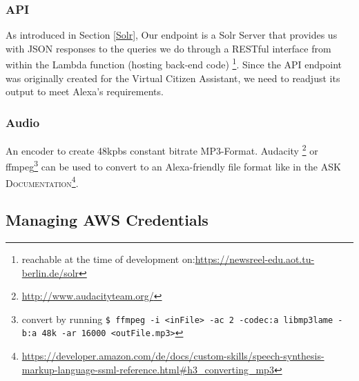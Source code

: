 	
\subsubsection*{API} 
As introduced in Section \ref{Solr}, Our endpoint is a Solr Server that provides us with JSON responses to the queries we do through a RESTful interface from within the Lambda function (hosting back-end code) \footnote{reachable at the time of development on:\url{https://newsreel-edu.aot.tu-berlin.de/solr}}. Since the API endpoint was originally created for the Virtual Citizen Assistant, we need to readjust its output to meet Alexa's requirements.






	
\subsubsection*{Audio} An encoder to create 48kpbs constant bitrate MP3-Format. Audacity \footnote{\url{http://www.audacityteam.org/}} or ffmpeg\footnote{convert by running \lstinline|$ ffmpeg -i <inFile> -ac 2 -codec:a libmp3lame -b:a 48k -ar 16000 <outFile.mp3>|} can be used to convert to an Alexa-friendly file format like in the \textsc{ASK Documentation}\footnote{\url{https://developer.amazon.com/de/docs/custom-skills/speech-synthesis-markup-language-ssml-reference.html\#h3_converting_mp3}}.
	


\subsection*{Managing AWS Credentials}

